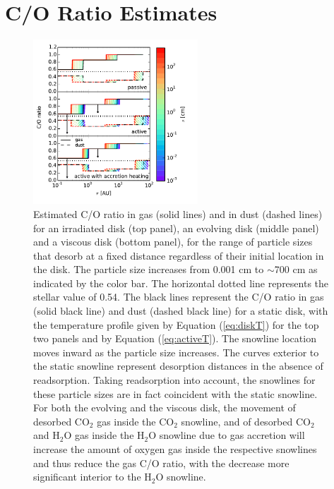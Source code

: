 \documentclass[apj]{emulateapj}
\newcommand{\emgr}[1]{\emph{ \color{gray} #1}}
\begin{document}


\section{C/O Ratio Estimates}
\label{sec:COratio}

\begin{figure}[h!]
\centering
\includegraphics[width=0.55\textwidth]{C_O_ratio_passive_active_disk_many_colorbar_complete_new.pdf}
\caption{Estimated C/O ratio in gas (solid lines) and in dust (dashed lines) for an irradiated disk (top panel), an evolving disk (middle panel) and a viscous disk (bottom panel), for the range of particle sizes that desorb at a fixed distance regardless of their initial location in the disk. The particle size increases from 0.001 cm to $\sim$700 cm as indicated by the color bar. The horizontal dotted line represents the stellar value of 0.54. The black lines represent the C/O ratio in gas (solid black line) and dust (dashed black line) for a static disk, with the temperature profile given by Equation (\ref{eq:diskT}) for the top two panels and by Equation (\ref{eq:activeT}). The snowline location moves inward as the particle size increases. The curves exterior to the static snowline represent desorption distances in the absence of readsorption.  Taking  readsorption into account, the snowlines for these particle sizes are in fact coincident with the static snowline. For both the evolving and the viscous disk, the movement of desorbed CO$_2$ gas inside the CO$_2$ snowline, and of desorbed CO$_2$ and H$_2$O gas inside the H$_2$O snowline due to gas accretion will increase the amount of oxygen gas inside the respective snowlines and thus reduce the gas C/O ratio, with the decrease more significant interior to the H$_2$O snowline.}
\label{fig:CO_ratio}
\end{figure}
\end{document}
